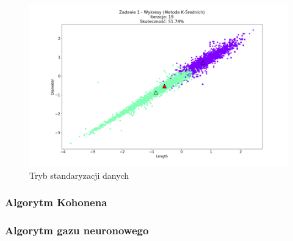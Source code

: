\documentclass{classrep}
\begin{document}
{{{				\begin{figure}[!htbp]
					\includegraphics[width=\textwidth]{wykresy/plot_k_meansAbaloneStandardise.png}
					\caption{Tryb standaryzacji danych}
				\end{figure}
			\FloatBarrier
		}

		\subsubsection{Algorytm Kohonena}
		{

		}

		\subsubsection{Algorytm gazu neuronowego}
		{

		}
	}
}
\end{document}
